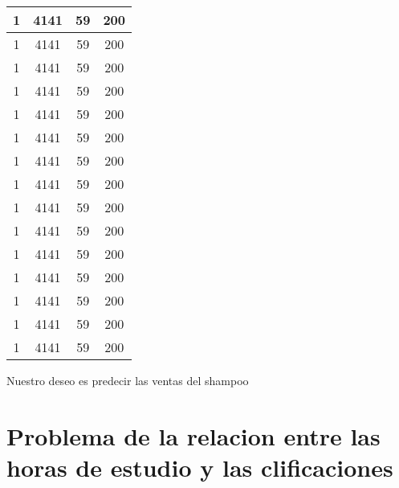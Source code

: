 \documentclass{article}
\begin{document}
\begin{table}
\begin{tabular}{|c|c|c|c|}
    1 & 4141 & 59 & 200 \\ \hline
    1 & 4141 & 59 & 200 \\ \hline
    1 & 4141 & 59 & 200 \\ \hline
    1 & 4141 & 59 & 200 \\ \hline
    1 & 4141 & 59 & 200 \\ \hline
    1 & 4141 & 59 & 200 \\ \hline
    1 & 4141 & 59 & 200 \\ \hline
    1 & 4141 & 59 & 200 \\ \hline
    1 & 4141 & 59 & 200 \\ \hline
    1 & 4141 & 59 & 200 \\ \hline
    1 & 4141 & 59 & 200 \\ \hline
    1 & 4141 & 59 & 200 \\ \hline
    1 & 4141 & 59 & 200 \\ \hline
    1 & 4141 & 59 & 200 \\ \hline
    1 & 4141 & 59 & 200 \\ \hline
    \end{tabular}
\end{table}

Nuestro deseo es predecir las ventas del shampoo
\section{Problema de la relacion entre las horas de estudio y las clificaciones}
\end{document}

